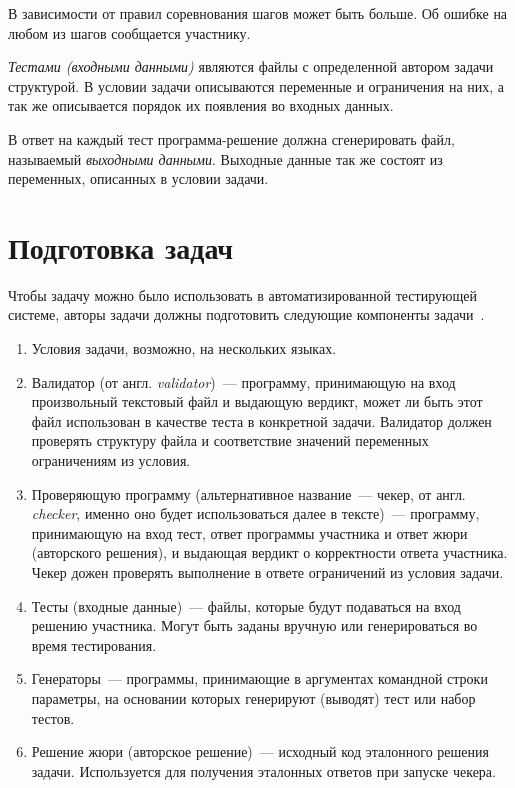 \documentclass[times,specification,annotation]{style/itmo-student-thesis/itmo-student-thesis}
\begin{document}
В зависимости от правил соревнования шагов может быть больше. Об ошибке на любом из шагов сообщается участнику.

\textit{Тестами (входными данными)} являются файлы с определенной автором задачи структурой. В условии задачи описываются переменные и ограничения на них, а так же описывается порядок их появления во входных данных.

В ответ на каждый тест программа-решение должна сгенерировать файл, называемый \textit{выходными данными}. Выходные данные так же состоят из переменных, описанных в условии задачи.

\section{Подготовка задач}

Чтобы задачу можно было использовать в автоматизированной тестирующей системе, авторы задачи должны подготовить следующие компоненты задачи~\cite{darkcyan-polygon-tutorial}.

\begin{enumerate}[leftmargin=1.75cm]
    \item Условия задачи, возможно, на нескольких языках.
    \item Валидатор (от англ. \textit{validator})~--- программу, принимающую на вход произвольный текстовый файл и выдающую вердикт, может ли быть этот файл использован в качестве теста в конкретной задачи. Валидатор должен проверять структуру файла и соответствие значений переменных ограничениям из условия.
    \item Проверяющую программу (альтернативное название~--- чекер, от англ. \textit{checker}, именно оно будет использоваться далее в тексте)~--- программу, принимающую на вход тест, ответ программы участника и ответ жюри (авторского решения), и выдающая вердикт о корректности ответа участника. Чекер дожен проверять выполнение в ответе ограничений из условия задачи.
    \item Тесты (входные данные)~--- файлы, которые будут подаваться на вход решению участника. Могут быть заданы вручную или генерироваться во время тестирования.
    \item Генераторы~--- программы, принимающие в аргументах командной строки параметры, на основании которых генерируют (выводят) тест или набор тестов.
    \item Решение жюри (авторское решение)~--- исходный код эталонного решения задачи. Используется для получения эталонных ответов при запуске чекера.
\end{enumerate}
\end{document}
